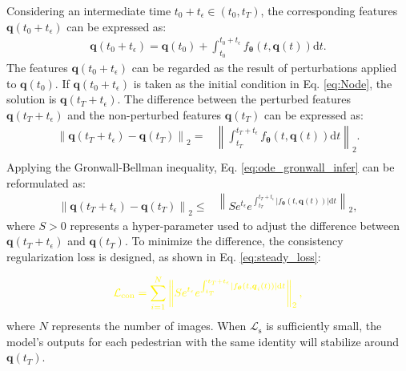 \documentclass[12pt]{spieman}  %
\begin{document}
\begin{spacing}{2}
		Considering an intermediate time $t_0+t_{\epsilon} \in (t_0, t_T)$, the corresponding features $\boldsymbol{q}(t_0+t_{\epsilon} )$ can be expressed as:
		\begin{equation}
			\label{eq:ode_intermeidate}
			\begin{aligned}
				\boldsymbol{q}(t_0+t_{\epsilon} ) = \boldsymbol{q}(t_0) + \int_{t_0}^{t_0+t_{\epsilon}}f_{\boldsymbol{\theta}}(t, \boldsymbol q(t))\mathrm{d}t.
			\end{aligned}
		\end{equation}
		The features $\boldsymbol{q}(t_0+t_{\epsilon} )$ can be regarded as the result of perturbations applied to $\boldsymbol{q}(t_0)$. If $\boldsymbol{q}(t_0+t_{\epsilon} )$ is taken as the initial condition in Eq. \eqref{eq:Node}, the solution is $\boldsymbol{q}(t_T + t_{\epsilon})$. The difference between the perturbed features $\boldsymbol{q}(t_T+t_{\epsilon})$ and the non-perturbed features $\boldsymbol{q}(t_T)$ can be expressed as:
		\begin{equation}
			\label{eq:ode_gronwall_infer}
			\begin{aligned}
				\left\| \boldsymbol{q}(t_T+t_{\epsilon})-\boldsymbol q(t_T)\right\|_{2}=&\left\| \int_{t_T}^{t_T+t_{\epsilon}}f_{\boldsymbol{\theta}}(t, \boldsymbol q(t))\mathrm{d}t\right\|_{2}. \\
			\end{aligned}
		\end{equation}
		Applying the Gronwall-Bellman inequality, Eq. \eqref{eq:ode_gronwall_infer} can be reformulated as:
		\begin{equation}
			\label{eq:ode_gronwall_infer2}
			\begin{aligned}
				\left\| \boldsymbol{q}(t_T+t_{\epsilon})-\boldsymbol q(t_T)\right\|_{2}
				\leq&\left\|Se^{t_{\epsilon}}e^{\int_{t_T}^{t_T+t_{\epsilon}}\left|f_{\boldsymbol{\theta}}(t, \boldsymbol q(t))\right| \mathrm{d}t}\right\|_{2},
			\end{aligned}
		\end{equation}
		where $S>0$ represents a hyper-parameter used to adjust the difference between $\boldsymbol{q}(t_T+t_{\epsilon})$ and $\boldsymbol{q}(t_T)$. To minimize the difference, the consistency regularization loss is designed, as shown in Eq. \eqref{eq:steady_loss}:
		
		\begin{equation}
			\label{eq:steady_loss}
			\textcolor{yellow}{\mathcal{L}_{\text{con}}=\sum_{i=1}^{N}\left\|S e^{t_{\epsilon}}e^{\int_{t_T}^{t_T+t_{\epsilon}}\left|f_{\boldsymbol{\theta}}(t, \boldsymbol q_i(t))\right| \mathrm{d}t}\right\|_{2},}
		\end{equation}
		where $N$ represents the number of images. When $\mathcal{L}_{\text{s}}$ is sufficiently small, the model's outputs for each pedestrian with the same identity will stabilize around $\boldsymbol{q}(t_T)$.
		

\end{spacing}
\end{document}
